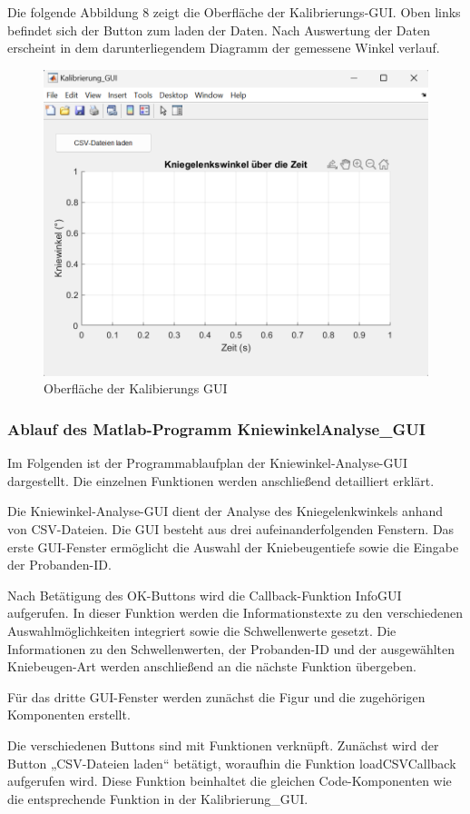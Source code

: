 \noindent Die folgende Abbildung 8 zeigt die Oberfläche der Kalibrierungs-GUI. Oben links befindet sich der Button zum laden der Daten. Nach Auswertung der Daten erscheint in dem darunterliegendem Diagramm der gemessene Winkel verlauf. 
\begin{figure}[ht]\centering
\includegraphics[width=0.75\linewidth]{images/Kalibrierung_GUI.png}
\caption{Oberfläche der Kalibierungs GUI}
\label{fig:Kalibrierungs GUI}
\end{figure}
\newpage
\subsubsection{Ablauf des Matlab-Programm KniewinkelAnalyse\_GUI}
\noindent Im Folgenden ist der Programmablaufplan der Kniewinkel-Analyse-GUI dargestellt. Die einzelnen Funktionen werden anschließend detailliert erklärt.

\noindent Die Kniewinkel-Analyse-GUI dient der Analyse des Kniegelenkwinkels anhand von CSV-Dateien. Die GUI besteht aus drei aufeinanderfolgenden Fenstern. Das erste GUI-Fenster ermöglicht die Auswahl der Kniebeugentiefe sowie die Eingabe der Probanden-ID.

\noindent Nach Betätigung des OK-Buttons wird die Callback-Funktion InfoGUI aufgerufen. In dieser Funktion werden die Informationstexte zu den verschiedenen Auswahlmöglichkeiten integriert sowie die Schwellenwerte gesetzt. Die Informationen zu den Schwellenwerten, der Probanden-ID und der ausgewählten Kniebeugen-Art werden anschließend an die nächste Funktion übergeben.

\noindent Für das dritte GUI-Fenster werden zunächst die Figur und die zugehörigen Komponenten erstellt.

\noindent Die verschiedenen Buttons sind mit Funktionen verknüpft. Zunächst wird der Button „CSV-Dateien laden“ betätigt, woraufhin die Funktion loadCSVCallback aufgerufen wird. Diese Funktion beinhaltet die gleichen Code-Komponenten wie die entsprechende Funktion in der Kalibrierung\_GUI.

